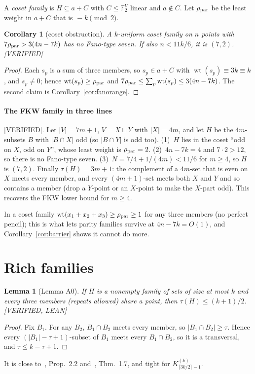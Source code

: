 \documentclass[11pt]{article}
\newtheorem{lemma}[theorem]{Lemma}
\newtheorem{corollary}[theorem]{Corollary}
\theoremstyle{definition}
\newcommand{\st}[1]{\textsf{\small[#1]}}
\newcommand{\F}{\mathbb{F}_2}
\newcommand{\wt}{\operatorname{wt}}
\begin{document}
A \emph{coset family} is $H\subseteq a+C$ with $C\le\F^V$ linear and $a\notin C$. Let $\rho_{\rm par}$ be the least
weight in $a+C$ that is $\equiv k\pmod2$.

\begin{corollary}[coset obstruction]\label{cor:7}
A $k$-uniform coset family on $n$ points with $7\rho_{\rm par}>3(4n-7k)$ has no Fano-type seven. If also
$n<11k/6$, it is $(7,2)$. \st{VERIFIED}
\end{corollary}
\begin{proof}
Each $s_p$ is a sum of three members, so $s_p\in a+C$ with $\wt(s_p)\equiv3k\equiv k$, and $s_p\neq0$; hence
$\wt(s_p)\ge\rho_{\rm par}$ and $7\rho_{\rm par}\le\sum_p\wt(s_p)\le3(4n-7k)$. The second claim is
Corollary~\ref{cor:fanorange}.
\end{proof}

\paragraph{The FKW family in three lines} \st{VERIFIED}. Let $|V|=7m+1$, $V=X\sqcup Y$ with $|X|=4m$, and let $H$ be
the $4m$-subsets $B$ with $|B\cap X|$ odd (so $|B\cap Y|$ is odd too). (1)~$H$ lies in the coset ``odd on $X$, odd on
$Y$'', whose least weight is $\rho_{\rm par}=2$. (2)~$4n-7k=4$ and $7\cdot2>12$, so there is no Fano-type seven.
(3)~$N=7/4+1/(4m)<11/6$ for $m\ge4$, so $H$ is $(7,2)$. Finally $\tau(H)=3m+1$: the complement of a $4m$-set that is
even on $X$ meets every member, and every $(4m+1)$-set meets both $X$ and $Y$ and so contains a member (drop a
$Y$-point or an $X$-point to make the $X$-part odd). This recovers the FKW lower bound for $m\ge4$.

In a coset family $\wt(x_1+x_2+x_3)\ge\rho_{\rm par}\ge1$ for any three members (no perfect pencil); this is what lets
parity families survive at $4n-7k=O(1)$, and Corollary~\ref{cor:barrier} shows it cannot do more.

\section{Rich families}\label{sec:rich}

\begin{lemma}[Lemma A0]\label{lem:A0}
If $H$ is a nonempty family of sets of size at most $k$ and every three members (repeats allowed) share a point, then
$\tau(H)\le(k+1)/2$. \st{VERIFIED, LEAN}
\end{lemma}
\begin{proof}
Fix $B_1$. For any $B_2$, $B_1\cap B_2$ meets every member, so $|B_1\cap B_2|\ge\tau$. Hence every
$(|B_1|-\tau+1)$-subset of $B_1$ meets every $B_1\cap B_2$, so it is a transversal, and $\tau\le k-\tau+1$.
\end{proof}
It is close to~\cite{NP}, Prop.~2.2 and~\cite{BDMS}, Thm.~1.7, and tight for $K^{(k)}_{\lceil3k/2\rceil-1}$.
\end{document}
